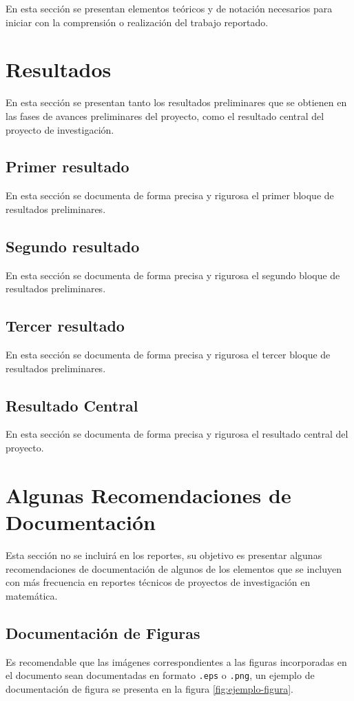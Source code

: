 \documentclass[peerreview]{IEEEtran}
\begin{document}
En esta secci\'on se presentan elementos te\'oricos y de notaci\'on necesarios para iniciar con la comprensi\'on o realizaci\'on del trabajo reportado.

\section{Resultados}
En esta secci\'on se presentan tanto los resultados preliminares que se obtienen en las fases de avances preliminares del proyecto, como el resultado central del proyecto de investigaci\'on. 
\subsection{Primer resultado}
En esta secci\'on se documenta de forma precisa y rigurosa el primer bloque de resultados preliminares.
\subsection{Segundo resultado}
En esta secci\'on se documenta de forma precisa y rigurosa el segundo bloque de resultados preliminares.
\subsection{Tercer resultado}
En esta secci\'on se documenta de forma precisa y rigurosa el tercer bloque de resultados preliminares.
\subsection{Resultado Central}
En esta secci\'on se documenta de forma precisa y rigurosa el resultado central del proyecto.

\section{Algunas Recomendaciones de Documentaci\'on}

Esta secci\'on no se incluir\'a en los reportes, su objetivo es presentar algunas recomendaciones de documentaci\'on de algunos de los elementos que se incluyen con m\'as frecuencia en reportes t\'ecnicos de proyectos de investigaci\'on en matem\'atica.

\subsection{Documentaci\'on de Figuras}
Es recomendable que las im\'agenes correspondientes a las figuras incorporadas en el documento sean documentadas en formato {\tt *.eps} o {\tt *.png}, un ejemplo de documentaci\'on de figura se presenta en la figura \ref{fig:ejemplo-figura}.
\end{document}
